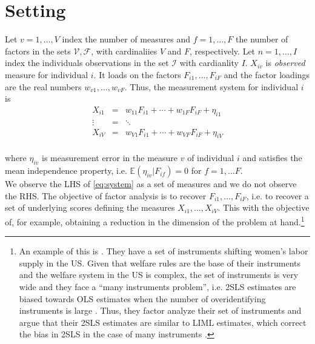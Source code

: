 \section{Setting}
Let $v = 1, \ldots, V$ index the number of measures and $f = 1, \ldots, F$ the number of factors in the sets $\mathcal{V}, \mathcal{F}$, with cardinaliies $V$ and $F$, respectively. Let $n = 1, \ldots, I$ index the individuals observations in the set $\mathcal{I}$ with cardianlity $I$. $X_{iv}$ is \textit{observed} measure for individual $i$. It loads on the factors $F_{i1}, \ldots, F_{iF}$ and the factor loadings are the real numbers $w_{v1}, \ldots, w_{vF}$. Thus, the measurement system for individual $i$ is 
\begin{eqnarray}
X_{i1} &=& w_{11}F_{i1} + \cdots + w_{1F}F_{iF} + \eta_{i1} \nonumber \\
\vdots &=& \ddots \nonumber \\
X_{iV} &=& w_{V1}F_{i1} + \cdots + w_{VF}F_{iF} + \eta_{iV} \label{eq:system} \\
\end{eqnarray}

\noindent where $\eta_{iv}$ is measurement error in the measure $v$ of individual $i$ and satisfies the mean independence property, i.e. $\mathbb{E} \left( \eta_{iv} | F_{if}  \right) = 0$ for $f = 1, \ldots F$.\\
\indent We observe the LHS of \eqref{eq:system} as a set of measures and we do not observe the RHS. The objective of factor analysis is to recover $F_{i1}, \ldots, F_{iF}$, i.e. to recover a set of underlying scores defining the measures  $X_{i1}, \ldots, X_{iV}$. This with the objective of, for example, obtaining a reduction in the dimension of the problem at hand.\footnote{An example of this is \citet{bernal2011child}. They have a set of instruments shifting women's labor supply in the US. Given that welfare rules are the base of their instruments and the welfare system in the US is complex, the set of instruments is very wide and they face a ``many instruments problem'', i.e. 2SLS estimates are biased towards OLS estimates when the number of overidentifying instruments is large \citep[see][]{stock2002testing,andrews2007testing,hansen2008estimation,anderson2010asymptotic}. Thus, they factor analyze their set of instruments and argue that their 2SLS estimates are similar to LIML estimates, which correct the bias in 2SLS in the case of many instruments \citep[see][]{hansen2008estimation}.}